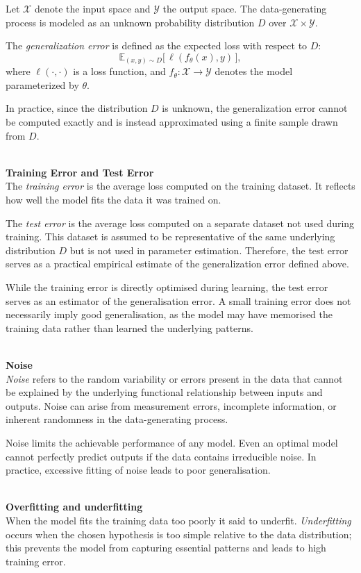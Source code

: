 Let $\mathcal{X}$ denote the input space and $\mathcal{Y}$ the output space. The data-generating process is modeled as an unknown probability distribution $D$ over $\mathcal{X} \times \mathcal{Y}$.

The \emph{generalization error} is defined as the expected loss with respect to $D$:
\[
\mathbb{E}_{(x,y)\sim D}\big[\,\ell(f_\theta(x), y)\,\big],
\]
where $\ell(\cdot,\cdot)$ is a loss function, and $f_\theta : \mathcal{X} \to \mathcal{Y}$ denotes the model parameterized by $\theta$.

In practice, since the distribution $D$ is unknown, the generalization error cannot be computed exactly and is instead approximated using a finite sample drawn from $D$.

\textbf{\\Training Error and Test Error\\}
The \emph{training error} is the average loss computed on the training dataset. It reflects how well the model fits the data it was trained on.

The \emph{test error} is the average loss computed on a separate dataset not used during training. This dataset is assumed to be representative of the same underlying distribution $D$ but is not used in parameter estimation. Therefore, the test error serves as a practical empirical estimate of the generalization error defined above.

While the training error is directly optimised during learning, the test error serves as an estimator of the generalisation error. A small training error does not necessarily imply good generalisation, as the model may have memorised the training data rather than learned the underlying patterns.

\textbf{\\Noise\\}
\emph{Noise} refers to the random variability or errors present in the data that cannot be explained by the underlying functional relationship between inputs and outputs. Noise can arise from measurement errors, incomplete information, or inherent randomness in the data-generating process.

Noise limits the achievable performance of any model. Even an optimal model cannot perfectly predict outputs if the data contains irreducible noise. In practice, excessive fitting of noise leads to poor generalisation.

\textbf{\\Overfitting and underfitting\\}
When the model fits the training data too poorly it said to underfit. \textit{Underfitting} occurs when the chosen hypothesis is too simple relative to the data distribution; this prevents the model from capturing essential patterns and leads to high training error.

